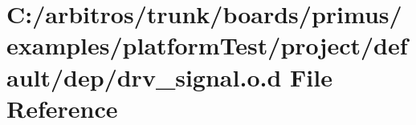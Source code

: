 \hypertarget{platform_test_2project_2default_2dep_2drv__signal_8o_8d}{\section{C\-:/arbitros/trunk/boards/primus/examples/platform\-Test/project/default/dep/drv\-\_\-signal.o.\-d File Reference}
\label{platform_test_2project_2default_2dep_2drv__signal_8o_8d}
}
